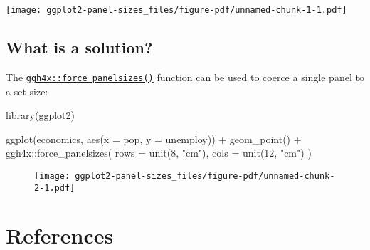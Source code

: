 \documentclass[
  letterpaper,
  DIV=11,
  numbers=noendperiod]{scrreprt}
\newenvironment{Shaded}{\begin{snugshade}}{\end{snugshade}}
\newcommand{\AttributeTok}[1]{\textcolor[rgb]{0.40,0.45,0.13}{#1}}
\newcommand{\DecValTok}[1]{\textcolor[rgb]{0.68,0.00,0.00}{#1}}
\newcommand{\FunctionTok}[1]{\textcolor[rgb]{0.28,0.35,0.67}{#1}}
\newcommand{\NormalTok}[1]{\textcolor[rgb]{0.00,0.23,0.31}{#1}}
\newcommand{\SpecialCharTok}[1]{\textcolor[rgb]{0.37,0.37,0.37}{#1}}
\newcommand{\StringTok}[1]{\textcolor[rgb]{0.13,0.47,0.30}{#1}}
\newlength{\cslhangindent}
\newlength{\cslentryspacingunit} %
\newenvironment{CSLReferences}[2] %
 {%
  \setlength{\parindent}{0pt}
  \ifodd #1
  \let\oldpar\par
  \def\par{\hangindent=\cslhangindent\oldpar}
  \fi
  \setlength{\parskip}{#2\cslentryspacingunit}
 }%
 {}
\begin{document}
\texttt{[image: ggplot2-panel-sizes\_files/figure-pdf/unnamed-chunk-1-1.pdf]}

\hypertarget{what-is-a-solution-2}{%
\section{What is a solution?}\label{what-is-a-solution-2}}

The
\href{https://teunbrand.github.io/ggh4x/reference/force_panelsizes.html}{\texttt{ggh4x::force\_panelsizes()}}
function can be used to coerce a single panel to a set size:

\begin{Shaded}
\begin{Highlighting}[]
\FunctionTok{library}\NormalTok{(ggplot2)}

\FunctionTok{ggplot}\NormalTok{(economics, }\FunctionTok{aes}\NormalTok{(}\AttributeTok{x =}\NormalTok{ pop, }\AttributeTok{y =}\NormalTok{ unemploy)) }\SpecialCharTok{+}
  \FunctionTok{geom\_point}\NormalTok{() }\SpecialCharTok{+}
\NormalTok{  ggh4x}\SpecialCharTok{::}\FunctionTok{force\_panelsizes}\NormalTok{(}
    \AttributeTok{rows =} \FunctionTok{unit}\NormalTok{(}\DecValTok{8}\NormalTok{, }\StringTok{"cm"}\NormalTok{),}
    \AttributeTok{cols =} \FunctionTok{unit}\NormalTok{(}\DecValTok{12}\NormalTok{, }\StringTok{"cm"}\NormalTok{)}
\NormalTok{  )}
\end{Highlighting}
\end{Shaded}

\begin{figure}[H]

{\centering \texttt{[image: ggplot2-panel-sizes\_files/figure-pdf/unnamed-chunk-2-1.pdf]}

}

\end{figure}


\hypertarget{references}{%
\chapter*{References}\label{references}}


\hypertarget{refs}{}
\begin{CSLReferences}{0}{0}
\end{CSLReferences}
\end{document}
